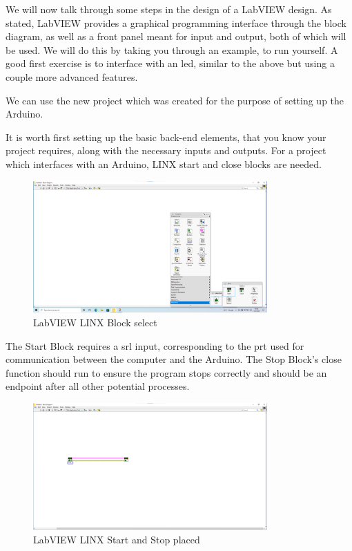 \documentclass[a4paper,11pt]{report}
\begin{document}
We will now talk through some steps in the design of a LabVIEW design. As stated, LabVIEW provides a graphical programming interface through the block diagram, as well as a front panel meant for input and output, both of which will be used. We will do this by taking you through an example, to run yourself. A good first exercise is to interface with an \gls{led}, similar to the above but using a couple more advanced features.

We can use the new project which was created for the purpose of setting up the Arduino.

It is worth first setting up the basic back-end elements, that you know your project requires, along with the necessary inputs and outputs. For a project which interfaces with an Arduino, LINX start and close blocks are needed.

\begin{figure}[H]
\centering
\includegraphics[width=0.8\textwidth]{screenshots/labview6}
\caption{LabVIEW LINX Block select}
\end{figure}

The Start Block requires a \gls{srl} input, corresponding to the \gls{prt} used for communication between the computer and the Arduino. The Stop Block's close function should run to ensure the program stops correctly and should be an endpoint after all other potential processes.

\begin{figure}[H]
\centering
\includegraphics[width=0.8\textwidth]{screenshots/labview7}
\caption{LabVIEW LINX Start and Stop placed}
\end{figure}
\end{document}
